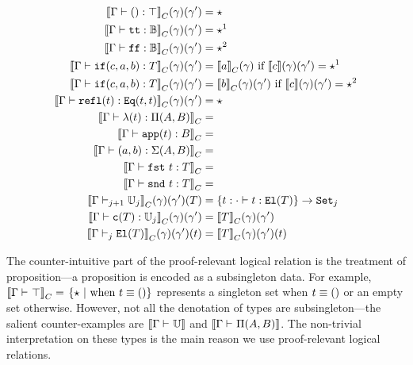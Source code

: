 \begin{align*}
  \denotesC{\goodTerm{\Gm}{\unit}{\top}}(\gm)(\gm') &= \star\\
  \denotesC{\goodTerm{\Gm}{\true}{\cB}}(\gm)(\gm') &= \star^1 \\
  \denotesC{\goodTerm{\Gm}{\false}{\cB}}(\gm)(\gm') &= \star^2 \\
  \denotesC{\goodTerm{\Gm}{\ifb{c}{a}{b}}{T}}(\gm)(\gm') &= \denotesC{a}(\gm) \text{ if } \denotes{c}(\gm)(\gm') = \star^1 \\
  \denotesC{\goodTerm{\Gm}{\ifb{c}{a}{b}}{T}}(\gm)(\gm') &= \denotesC{b}(\gm)(\gm') \text{ if } \denotes{c}(\gm)(\gm') = \star^2 \\
  \denotesC{\goodTerm{\Gm}{\eqrefl{t}}{\TyId{t}{t}}}(\gm)(\gm') &= \star\\
  \denotesC{\goodTerm{\Gm}{\lam{t}}{\TyPi{A}{B}}} &= \\
  \denotesC{\goodTerm{\Gm}{\app{t}}{B}} &= \\
  \denotesC{\goodTerm{\Gm}{\pair{a}{b}}{\TySigma{A}{B}}} &= \\
  \denotesC{\goodTerm{\Gm}{\fst{t}}{T}} &= \\
  \denotesC{\goodTerm{\Gm}{\snd{t}}{T}} &= \\
  \denotesC{\goodType{\Gm}{\cU_j}{j+1}}(\gm)(\gm')(T) &= \{t : \goodTerm{\cdot}{t}{\El{T}}\}  \to \Set{j} \\
  \denotesC{\goodTerm{\Gm}{\codety{T}}{\cU_j}}(\gm)(\gm') &= \denotesC{T}(\gm)(\gm') \\ 
  \denotesC{\goodType{\Gm}{\El{T}}{j}}(\gm)(\gm')(t) &= \denotesC{T}(\gm)(\gm')(t) \\
\end{align*}

\newcommand{\Glued}[1]{\ensuremath{{#1}^c}}
\newcommand{\GluedPi}[2]{\ensuremath{\Pi^c({#1},{#2})}}
\newcommand{\GSubstExt}[2]{\ensuremath{{#1},^c{#2}}}
\newcommand{\Gpair}[2]{\ensuremath{({#1},^c{#2})}}
\newcommand{\Gfst}[1]{\ensuremath{\texttt{fst}^c~{#1}}}
\newcommand{\Gsnd}[1]{\ensuremath{\texttt{snd}^c~{#1}}}
\newcommand{\Gsub}[2]{\ensuremath{{#1}\!\left[{#2}\right]^c}}
\newcommand{\Gapp}[1]{\ensuremath{\texttt{app}^c({#1})}}
\newcommand{\GSubstWeak}[1]{\ensuremath{(\texttt{p}^c)^{#1}}}
\newcommand{\GLSigAdd}[3]{\ensuremath{\nu^{+c}({#1},{#2},{#3})}}
\newcommand{\GCaseSig}[3]{\ensuremath{\texttt{CaseTy}^c({#1},{#2},{#3})}}

The counter-intuitive part of the proof-relevant logical relation is the treatment of proposition---a proposition is encoded as a subsingleton data. For example, $\denotesC{\goodType{\Gm}{\top}{}} = $ $ \{\star \ | \text{  when } t \equiv \unit \}$ represents a singleton set when $t \equiv \unit$ or an empty set otherwise. However, not all the denotation of types are subsingleton---the salient counter-examples are $\denotes{\goodType{\Gm}{\cU}{}}$ and $\denotes{\goodType{\Gm}{\TyPi{A}{B}}{}}$. The non-trivial interpretation on these types is the main reason we use proof-relevant logical relations.


